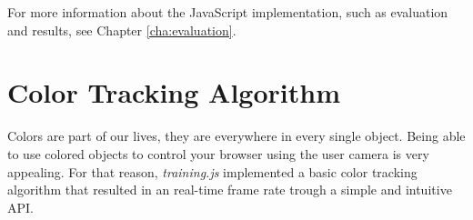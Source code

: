 For more information about the JavaScript \cite{International2009} implementation, such as evaluation and results, see Chapter \ref{cha:evaluation}.


\section{Color Tracking Algorithm} %
\label{sec:ar_library_for_the_web:color_tracking_algorithm}

Colors are part of our lives, they are everywhere in every single object. Being able to use colored objects to control your browser using the user camera is very appealing. For that reason, \textit{training.js} implemented a basic color tracking algorithm that resulted in an real-time frame rate trough a simple and intuitive API.


